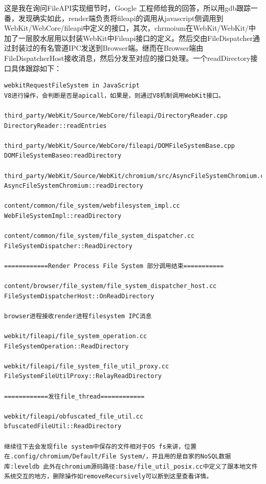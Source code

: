 这是我在询问FileAPI实现细节时，Google 工程师给我的回答，所以用gdb跟踪一番，发现确实如此，render端负责将fileapi的调用从javascript侧调用到WebKit/WebCore/fileapi中定义的接口，其次，chrmoium在WebKit/WebKit/中加了一层胶水层用以封装WebKit中Fileapi接口的定义。然后交由FileDispatcher通过封装过的有名管道IPC发送到Browser端。继而在Browser端由FileDispatcherHost接收消息，然后分发至对应的接口处理。一个readDirectory接口具体跟踪如下：
\begin{verbatim}
webkitRequestFileSystem in JavaScript
V8进行操作，会判断是否是apicall，如果是，则通过V8机制调用WebKit接口。

third_party/WebKit/Source/WebCore/fileapi/DirectoryReader.cpp
DirectoryReader::readEntries

third_party/WebKit/Source/WebCore/fileapi/DOMFileSystemBase.cpp
DOMFileSystemBaseo:readDirectory

third_party/WebKit/Source/WebKit/chromium/src/AsyncFileSystemChromium.cpp
AsyncFileSystemChromium::readDirectory

content/common/file_system/webfilesystem_impl.cc
WebFileSystemImpl::readDirectory

content/common/file_system/file_system_dispatcher.cc
FileSystemDispatcher::ReadDirectory

============Render Process File System 部分调用结束===========

content/browser/file_system/file_system_dispatcher_host.cc
FileSystemDispatcherHost::OnReadDirectory

browser进程接收render进程filesystem IPC消息

webkit/fileapi/file_system_operation.cc
FileSystemOperation::ReadDirectory

webkit/fileapi/file_system_file_util_proxy.cc
FileSystemFileUtilProxy::RelayReadDirectory

============发往file_thread============

webkit/fileapi/obfuscated_file_util.cc
bfuscatedFileUtil::ReadDirectory

继续往下去会发现file system中保存的文件相对于OS fs来讲，位置在.config/chromium/Default/File System/，并且用的是自家的NoSQL数据库:leveldb 此外在chromium源码路径:base/file_util_posix.cc中定义了跟本地文件系统交互的地方，删除操作如removeRecursively可以断到这里查看详情。
\end{verbatim}
